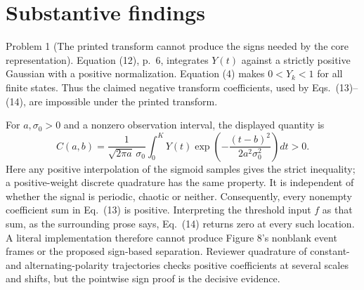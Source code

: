 \documentclass[10pt]{article}
\begin{document}
\section*{Substantive findings}
Problem 1 (The printed transform cannot produce the signs needed by the core representation).  Equation (12), p. 6, integrates \(Y(t)\) against a strictly positive Gaussian with a positive normalization. Equation (4) makes \(0<Y_k<1\) for all finite states. Thus the claimed negative transform coefficients, used by Eqs. (13)–(14), are impossible under the printed transform.\par
For \(a,\sigma_0>0\) and a nonzero observation interval, the displayed quantity is \[C(a,b)=\frac1{\sqrt{2\pi a}\,\sigma_0}\int_0^K
 Y(t)\exp\!\left(-\frac{(t-b)^2}{2a^2\sigma_0^2}\right)dt>0.\] Here any positive interpolation of the sigmoid samples gives the strict inequality; a positive-weight discrete quadrature has the same property. It is independent of whether the signal is periodic, chaotic or neither. Consequently, every nonempty coefficient sum in Eq. (13) is positive. Interpreting the threshold input \(f\) as that sum, as the surrounding prose says, Eq. (14) returns zero at every such location. A literal implementation therefore cannot produce Figure 8’s nonblank event frames or the proposed sign-based separation. Reviewer quadrature of constant- and alternating-polarity trajectories checks positive coefficients at several scales and shifts, but the pointwise sign proof is the decisive evidence.\par
\end{document}

